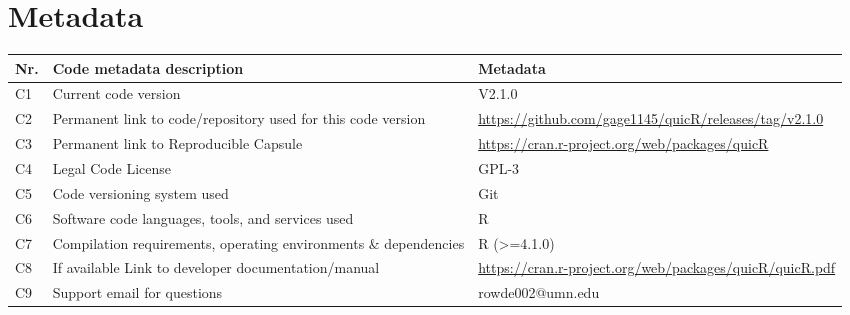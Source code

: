\documentclass[preprint,12pt,a4paper]{elsarticle}
\providecommand{\DIFaddbeginFL}{} %
\providecommand{\DIFaddendFL}{} %
\providecommand{\DIFdelbeginFL}{} %
\providecommand{\DIFdelendFL}{} %
\begin{document}
    \section*{Metadata}

    \begin{table}[ht]
        \fontsize{9pt}{9pt}\selectfont
        \centering
        \begin{tabular}{lp{6cm}p{6cm}}
            \DIFdelbeginFL %
\DIFdelendFL \DIFaddbeginFL \hline
            \DIFaddendFL \textbf{Nr.} & \textbf{Code metadata description} & \textbf{Metadata} \\
            \DIFdelbeginFL %
\DIFdelendFL \DIFaddbeginFL \hline
            \DIFaddendFL C1 & Current code version & V2.1.0 \\
C2 & Permanent link to code/repository used for this code version & \url{https://github.com/gage1145/quicR/releases/tag/v2.1.0} \\
C3  & Permanent link to Reproducible Capsule & \url{https://cran.r-project.org/web/packages/quicR}\\
C4 & Legal Code License & GPL-3\\
C5 & Code versioning system used & Git\\
C6 & Software code languages, tools, and services used & R\\
C7 & Compilation requirements, operating environments \& dependencies & R (>=4.1.0)\\
C8 & If available Link to developer documentation/manual & \url{https://cran.r-project.org/web/packages/quicR/quicR.pdf}\\
C9 & Support email for questions & rowde002@umn.edu\\
            \DIFdelbeginFL %
\DIFdelendFL \DIFaddbeginFL \hline
        \DIFaddendFL \end{tabular}
    \end{table}
\end{document}
